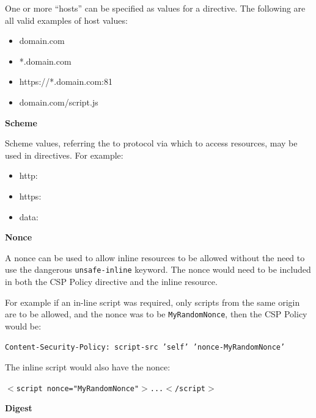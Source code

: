 \documentclass{mscreport}
\begin{document}
\vspace{0.3cm} \noindent
One or more ``hosts'' can be specified as values for a directive. The following are all valid examples of host values:
\begin{itemize}
	\setlength\itemsep{0.1em}
	\item domain.com
	\item *.domain.com
	\item https://*.domain.com:81
	\item domain.com/script.js
\end{itemize}

\vspace{0.5cm} \noindent
\textbf{Scheme}

\vspace{0.3cm} \noindent
Scheme values, referring the to protocol via which to access resources, may be used in directives. For example:

\begin{itemize}
	\setlength\itemsep{0.1em}
	\item http:
	\item https:
	\item data:
\end{itemize}

\vspace{0.5cm} \noindent
\textbf{Nonce}

\vspace{0.3cm} \noindent
A nonce can be used to allow inline resources to be allowed without the need to use the dangerous \texttt{unsafe-inline} keyword. The nonce would need to be included in both the CSP Policy directive and the inline resource.

\vspace{0.3cm} \noindent
For example if an in-line script was required, only scripts from the same origin are to be allowed, and the nonce was to be \texttt{MyRandomNonce}, then the CSP Policy would be:

\vspace{0.3cm} \noindent
\texttt{Content-Security-Policy: script-src 'self' 'nonce-MyRandomNonce'}

\vspace{0.3cm} \noindent
The inline script would also have the nonce:

\vspace{0.3cm} \noindent
\texttt{$<$script nonce="MyRandomNonce"$>$...$<$/script$>$}



\vspace{0.7cm} \noindent
\textbf{Digest}
\end{document}
